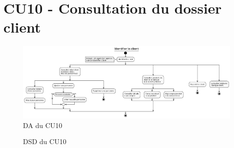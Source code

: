 \section{CU10 - Consultation du dossier client}
\begin{figure}[H]
\centering
\includegraphics[width=22cm, angle=90]{figures/DA_CU10.png}
\caption{DA du CU10}
\end{figure}



\begin{figure}[H]
\noindent{}
\caption{DSD du CU10}
\end{figure}
